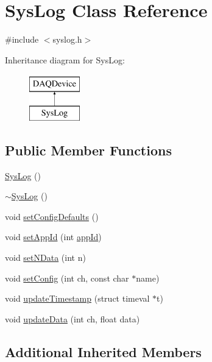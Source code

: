\hypertarget{classSysLog}{\section{Sys\-Log Class Reference}
\label{classSysLog}
}


{\ttfamily \#include $<$syslog.\-h$>$}

Inheritance diagram for Sys\-Log\-:\begin{figure}[H]
\begin{center}
\leavevmode
\includegraphics[height=2.000000cm]{classSysLog}
\end{center}
\end{figure}
\subsection*{Public Member Functions}
\begin{DoxyCompactItemize}
\item 
\hyperlink{classSysLog_a06c2e3fd7b6e5dca3cfbcc0b913c6e75}{Sys\-Log} ()
\item 
\hyperlink{classSysLog_ad5b4de59a0e4c4be08430073d43fee5c}{$\sim$\-Sys\-Log} ()
\item 
void \hyperlink{classSysLog_a7a68d2e9cb7ab67ba5fac6a842ddf9ed}{set\-Config\-Defaults} ()
\item 
void \hyperlink{classSysLog_a1a6772be111f471271fce194955e69f8}{set\-App\-Id} (int \hyperlink{classDAQDevice_a2f0b3d2e531be7f5d06f47a4753d35bd}{app\-Id})
\item 
void \hyperlink{classSysLog_a6b6900287d6fca70de47fb11c3b4877d}{set\-N\-Data} (int n)
\item 
void \hyperlink{classSysLog_a6f7aa19cdb467d56ea0af13b3dd7a01d}{set\-Config} (int ch, const char $\ast$name)
\item 
void \hyperlink{classSysLog_aeb21706d3a9353ab083662bae6430a3d}{update\-Timestamp} (struct timeval $\ast$t)
\item 
void \hyperlink{classSysLog_a0b61756d28ad5d54344ecf66031b6407}{update\-Data} (int ch, float data)
\end{DoxyCompactItemize}
\subsection*{Additional Inherited Members}


